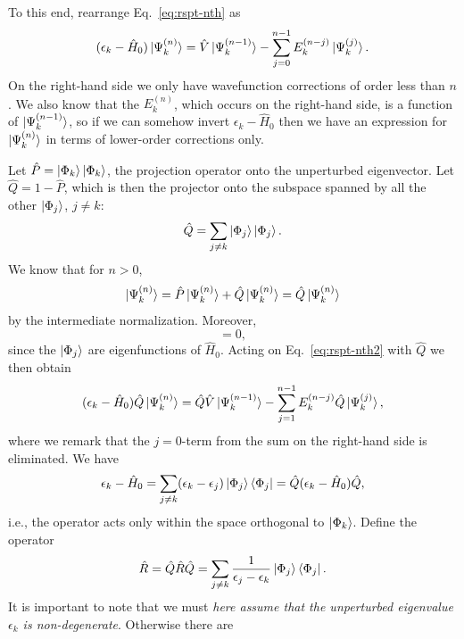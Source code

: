 \documentclass{report}
\theoremstyle{plain}
\theoremstyle{definition}
\begin{document}
To this end, rearrange Eq.~\eqref{eq:rspt-nth} as
\begin{equation}
  (\epsilon_k - \hat{H}_0 )\ket{\Psi_k^{(n)}} = \hat{V}
  \ket{\Psi_k^{(n-1)}} - \sum_{j=0}^{n-1}
  E_k^{(n-j)} \ket{\Psi_k^{(j)}}. \label{eq:rspt-nth2}
\end{equation}
On the right-hand side we only have wavefunction corrections of order
less than $n$. We also know that the $E_k^{(n)}$, which occurs on the
right-hand side, is a function of $\ket{\Psi_k^{(n-1)}}$, so if we can
somehow invert $\epsilon_k - \hat{H}_0$ then we have an expression for
$\ket{\Psi_k^{(n)}}$ in terms of lower-order corrections only.

Let $\hat{P} = \ket{\Phi_k}\ket{\Phi_k}$, the projection operator onto
the unperturbed eigenvector. Let $\hat{Q} = 1 - \hat{P}$, which is
then the projector onto the subspace spanned by all the other
$\ket{\Phi_j}$, $j\neq k$:
\begin{equation}
  \hat{Q} = \sum_{j\neq k} \ket{\Phi_j}\ket{\Phi_j}.
\end{equation}
We know that for $n>0$,
\begin{equation}
  \ket{\Psi_k^{(n)}} = \hat{P}\ket{\Psi_k^{(n)}} + \hat{Q}
  \ket{\Psi_k^{(n)}} = \hat{Q}\ket{\Psi_k^{(n)}}
\end{equation}
by the intermediate normalization. Moreover,
\begin{equation}
  [\hat{H}_0,\hat{Q}] = 0,
\end{equation}
since the $\ket{\Phi_j}$ are eigenfunctions of $\hat{H}_0$. Acting
on Eq.~\eqref{eq:rspt-nth2} with $\hat{Q}$ we then obtain
\begin{equation}
  (\epsilon_k - \hat{H}_0) \hat{Q}\ket{\Psi_k^{(n)}} = 
  \hat{Q}\hat{V} \ket{\Psi_k^{(n-1)}} - \sum_{j=1}^{n-1} E_k^{(n-j)} \hat{Q}\ket{\Psi_k^{(j)}},
\end{equation}
where we remark that the $j=0$-term from the sum on the right-hand
side is eliminated.
We have
\begin{equation}
  \epsilon_k - \hat{H}_0 = \sum_{j\neq k} (\epsilon_k -
  \epsilon_j)\ket{\Phi_j}\bra{\Phi_j} = \hat{Q}(\epsilon_k - \hat{H}_0)\hat{Q},
\end{equation}
i.e., the operator acts only within the space orthogonal to $\ket{\Phi_k}$.
Define the operator
\begin{equation}
  \hat{R} = \hat{Q}\hat{R}\hat{Q} = \sum_{j\neq k} \frac{1}{\epsilon_j - \epsilon_k}
  \ket{\Phi_j}\bra{\Phi_j} .
\end{equation}
It is important to note that we must \emph{here assume that the unperturbed
  eigenvalue $\epsilon_k$ is non-degenerate}. Otherwise there are
\end{document}
